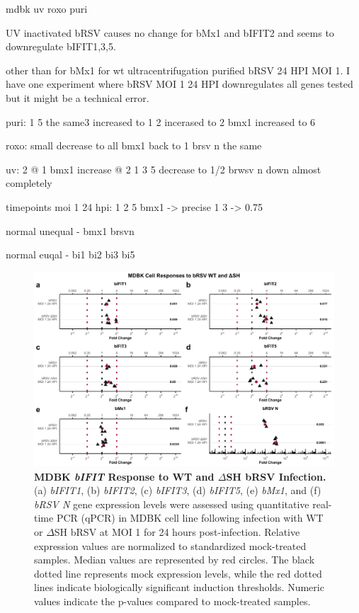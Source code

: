 mdbk uv roxo puri

UV inactivated bRSV causes no change for bMx1 and bIFIT2 and seems to downregulate bIFIT1,3,5.

other than for bMx1 for wt ultracentrifugation purified bRSV 24 HPI MOI 1. I have one experiment where bRSV MOI 1 24 HPI downregulates all genes tested but it might be a technical error. 

puri:
1 5 the same3 increased to 1
2 incerased to 2
bmx1 increased to 6

roxo:
small decrease to all
bmx1 back to 1
brsv n the same

uv:
2 @ 1
bmx1 increase @ 2
1 3 5 decrease to 1/2
brwsv n down almost completely

timepoints moi 1 24 hpi:
1 2 5 bmx1 -> precise 1
3 -> 0.75

normal unequal - bmx1 brsvn

normal euqal - bi1 bi2 bi3 bi5


\begin{figure}
    \centering
    \includegraphics[width=1\linewidth]{07. Chapter 2/Figs/02. Induction/05. mdbk_brsv_moi1_dsh.pdf}
    \caption[MDBK \textit{bIFIT} Response to WT and \(\Delta\)SH bRSV Infection.]{\textbf{MDBK \textit{bIFIT} Response to WT and \(\Delta\)SH bRSV Infection.} (a) \textit{bIFIT1}, (b) \textit{bIFIT2}, (c) \textit{bIFIT3}, (d) \textit{bIFIT5}, (e) \textit{bMx1}, and (f) \textit{bRSV N} gene expression levels were assessed using quantitative real-time PCR (qPCR) in MDBK cell line following infection with WT or \(\Delta\)SH bRSV at MOI 1 for 24 hours post-infection. Relative expression values are normalized to standardized mock-treated samples. Median values are represented by red circles. The black dotted line represents mock expression levels, while the red dotted lines indicate biologically significant induction thresholds. Numeric values indicate the p-values compared to mock-treated samples.}
    \label{fig:MDBK responses to dSH}
\end{figure}



